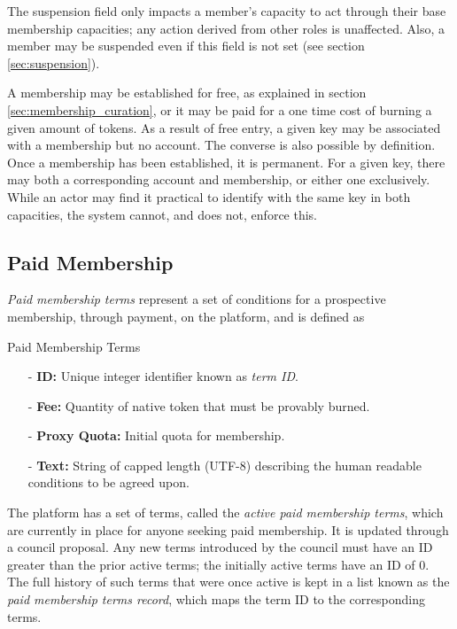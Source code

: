 \documentclass{article}
\newenvironment{concept_box}[1]
    {
    \begin{tcolorbox}
    {\large \textbf{#1} }
    }
    {
    \end{tcolorbox}
    }
\begin{document}
The suspension field only impacts a member's capacity to act through their base membership capacities; any action derived from other roles is unaffected. Also, a member may be suspended even if this field is not set (see section \ref{sec:suspension}).

A membership may be established for free, as explained in section \ref{sec:membership_curation}, or it may be paid for a one time cost of burning a given amount of tokens. As a result of free entry, a given key may be associated with a membership but no account. The converse is also possible by definition. Once a membership has been established, it is permanent. For a given key, there may both a corresponding account and membership, or either one exclusively. While an actor may find it practical to identify with the same key in both capacities, the system cannot, and does not, enforce this.


\subsection{Paid Membership} \label{sec:paid_membership}

\textit{Paid membership terms} represent a set of conditions for a prospective membership, through payment, on the platform, and is defined as\\

\begin{concept_box}{Paid Membership Terms}
    \begin{itemize}
      \item[-] \textbf{ID:} Unique integer identifier known as \textit{term ID}.
      \item[-] \textbf{Fee:} Quantity of native token that must be provably burned.
      \item[-] \textbf{Proxy Quota:} Initial quota for membership.
      \item[-] \textbf{Text:} String of capped length (UTF-8) describing the human readable conditions to be agreed upon.
    \end{itemize}
\end{concept_box}

The platform has a set of terms, called the \textit{active paid membership terms}, which are currently in place for anyone seeking paid membership. It is updated through a council proposal. Any new terms introduced by the council must have an ID greater than the prior active terms; the initially active terms have an ID of $0$. The full history of such terms that were once active is kept in a list known as the \textit{paid membership terms record}, which maps the term ID to the corresponding terms.
\end{document}
